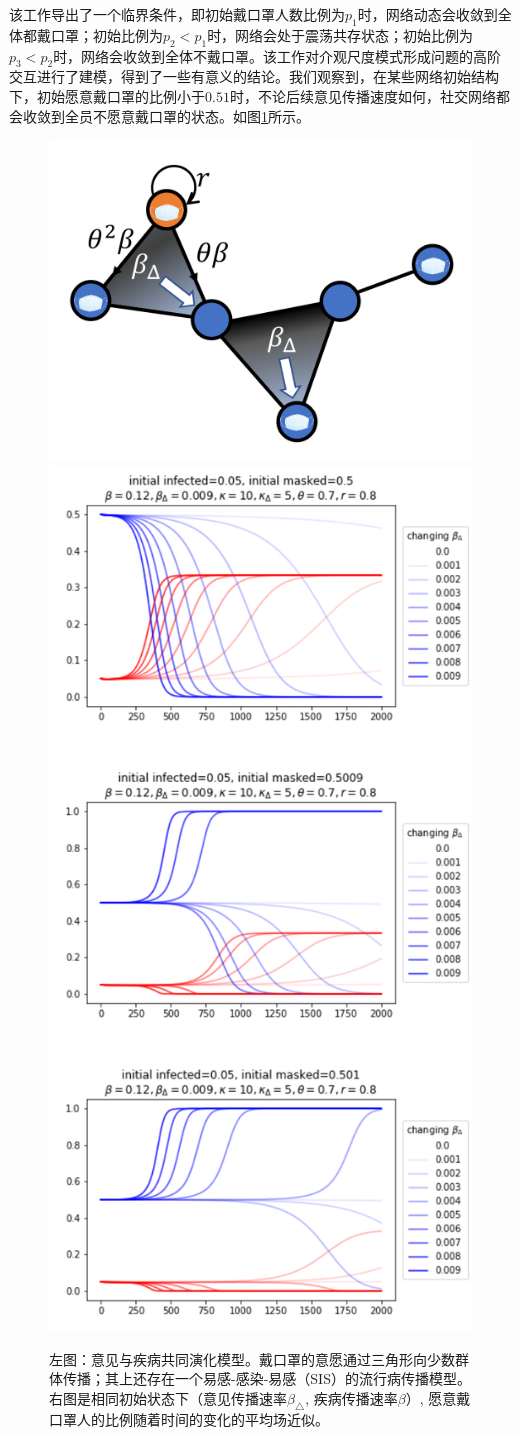 该工作导出了一个临界条件，即初始戴口罩人数比例为$p_1$时，网络动态会收敛到全体都戴口罩；初始比例为$p_2<p_1$时，网络会处于震荡共存状态；初始比例为$p_3<p_2$时，网络会收敛到全体不戴口罩。该工作对介观尺度模式形成问题的高阶交互进行了建模，得到了一些有意义的结论。我们观察到，在某些网络初始结构下，初始愿意戴口罩的比例小于$0.51$时，不论后续意见传播速度如何，社交网络都会收敛到全员不愿意戴口罩的状态。如图\ref{fig:masksketch}所示。

\begin{figure}
    \centering
    \includegraphics[width = 0.45\linewidth]{Figs/masksketch.png}
    \includegraphics[width = 0.45\linewidth]{Figs/maskresult.png}
    \caption{左图：意见与疾病共同演化模型。戴口罩的意愿通过三角形向少数群体传播；其上还存在一个易感-感染-易感（SIS）的流行病传播模型。右图是相同初始状态下（意见传播速率$\beta_\triangle $, 疾病传播速率$\beta$）, 愿意戴口罩人的比例随着时间的变化的平均场近似。}
    \label{fig:masksketch}
\end{figure}


